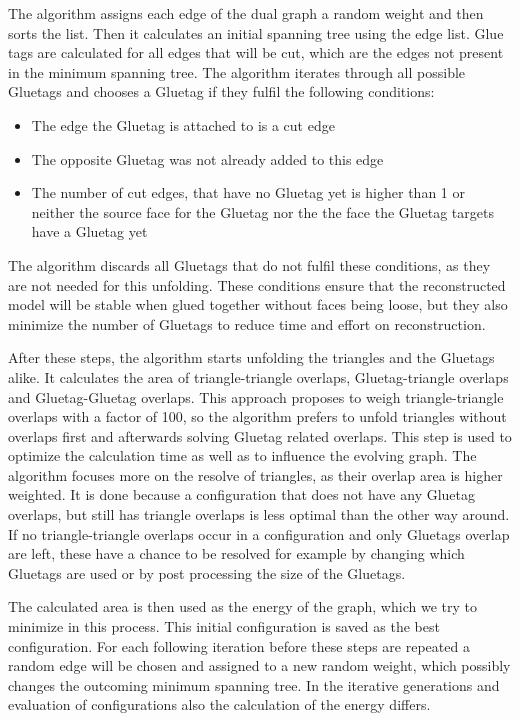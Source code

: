 \documentclass[draft,final]{vutinfth} %
\begin{document}
The algorithm assigns each edge of the dual graph a random weight and then sorts the list. Then it calculates an initial spanning tree using the edge list. Glue tags are calculated for all edges that will be cut, which are the edges not present in the minimum spanning tree. The algorithm iterates through all possible Gluetags and chooses a Gluetag if they fulfil the following conditions:

\begin{itemize}
	\item The edge the Gluetag is attached to is a cut edge
	\item The opposite Gluetag was not already added to this edge
	\item The number of cut edges, that have no Gluetag yet is higher than 1 or neither the source face for the Gluetag nor the the face the Gluetag targets have a Gluetag yet
\end{itemize}

The algorithm discards all Gluetags that do not fulfil these conditions, as they are not needed for this unfolding. These conditions ensure that the reconstructed model will be stable when glued together without faces being loose, but they also minimize the number of Gluetags to reduce time and effort on reconstruction.

After these steps, the algorithm starts unfolding the triangles and the Gluetags alike. It calculates the area of triangle-triangle overlaps, Gluetag-triangle overlaps and Gluetag-Gluetag overlaps. This approach proposes to weigh triangle-triangle overlaps with a factor of 100, so the algorithm prefers to unfold triangles without overlaps first and afterwards solving Gluetag related overlaps. This step is used to optimize the calculation time as well as to influence the evolving graph. The algorithm focuses more on the resolve of triangles, as their overlap area is higher weighted. It is done because a configuration that does not have any Gluetag overlaps, but still has triangle overlaps is less optimal than the other way around. If no triangle-triangle overlaps occur in a configuration and only Gluetags overlap are left, these have a chance to be resolved for example by changing which Gluetags are used or by post processing the size of the Gluetags.

The calculated area is then used as the energy of the graph, which we try to minimize in this process. This initial configuration is saved as the best configuration. For each following iteration before these steps are repeated a random edge will be chosen and assigned to a new random weight, which possibly changes the outcoming minimum spanning tree. In the iterative generations and evaluation of configurations also the calculation of the energy differs. 
\end{document}
